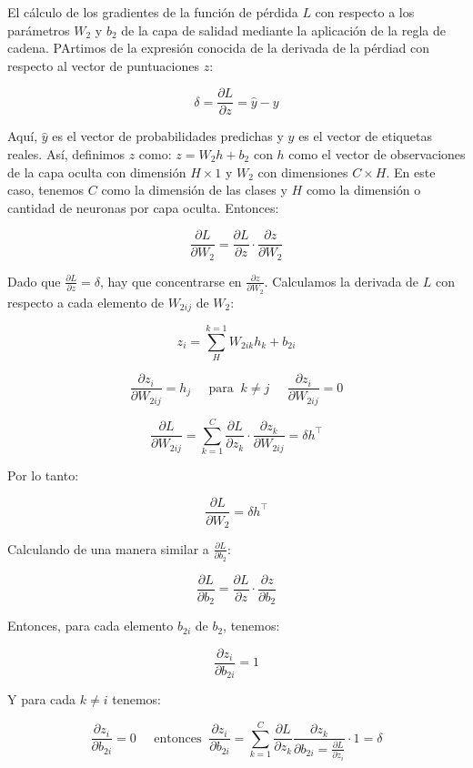 El cálculo de los gradientes de la función de pérdida $L$ con respecto a los parámetros $W_2$ y $b_2$ de la
capa de salidad mediante la aplicación de la regla de cadena. PArtimos de la expresión conocida de la derivada
de la pérdiad con respecto al vector de puntuaciones $z$:

\[
    \delta = \frac{\partial L}{\partial z} = \hat{y} - y
\]

Aquí, $\hat{y}$ es el vector de probabilidades predichas y $y$ es el vector de etiquetas reales. Así, definimos
$z$ como: $z = W_2 h + b_2$ con $h$ como el vector de observaciones de la capa oculta con dimensión $H \times 1$
y $W_2$ con dimensiones $C \times H$. En este caso, tenemos $C$ como la dimensión de las clases y $H$ como la 
dimensión o cantidad de neuronas por capa oculta. Entonces:

\[
    \frac{\partial L}{\partial W_2} = \frac{\partial L}{\partial z} \cdot \frac{\partial z}{\partial W_2}
\]

Dado que $\frac{\partial L}{\partial z} = \delta$, hay que concentrarse en $\frac{\partial z}{\partial W_2}$. 
Calculamos la derivada de $L$ con respecto a cada elemento de $W_{2ij}$ de $W_2$:

\[
    z_i = \sum_{H}^{k = 1} W_{2ik} h_k + b_{2i}
\]

\[
    \frac{\partial z_i}{\partial W_{2ij}} = h_j \;\;\;\;\; \text{para} \;\; k \neq j \;\;\;\;\; \frac{\partial z_i}{\partial W_{2ij}} = 0
\]

\[
    \frac{\partial L}{\partial W_{2ij}} = \sum_{k = 1}^{C} \frac{\partial L}{\partial z_k} \cdot \frac{\partial z_k}{\partial W_{2ij}} = \delta h^\top
\]

Por lo tanto:

\[
    \frac{\partial L}{\partial W_2} = \delta h^\top
\]

Calculando de una manera similar a $\frac{\partial L}{\partial b_2}$:

\[
    \frac{\partial L}{\partial b_2} = \frac{\partial L}{\partial z} \cdot \frac{\partial z}{\partial b_2}
\]

Entonces, para cada elemento $b_{2i}$ de $b_2$, tenemos:

\[
    \frac{\partial z_i}{\partial b_{2i}} = 1
\]

Y para cada $k \neq i$ tenemos:

\[
    \frac{\partial z_i}{\partial b_{2i}} = 0 \;\;\;\;\; \text{entonces} \;\; \frac{\partial z_i}{\partial b_{2i}} = \sum_{k=1}^{C} \frac{\partial L}{\partial z_{k}} \frac{\partial z_k}{\partial b_{2i} = \frac{\partial L}{\partial z_{i}}} \cdot 1 = \delta
\]

